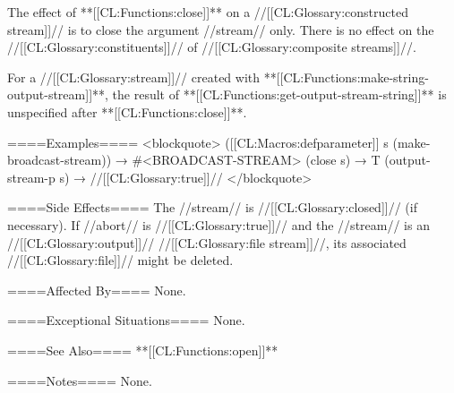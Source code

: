 The effect of **[[CL:Functions:close]]** on a //[[CL:Glossary:constructed stream]]// is to close the argument //stream// only. There is no effect on the //[[CL:Glossary:constituents]]// of //[[CL:Glossary:composite streams]]//.

For a //[[CL:Glossary:stream]]// created with **[[CL:Functions:make-string-output-stream]]**, the result of **[[CL:Functions:get-output-stream-string]]** is unspecified after **[[CL:Functions:close]]**.


====Examples====
<blockquote> ([[CL:Macros:defparameter]] s (make-broadcast-stream)) → #<BROADCAST-STREAM> (close s) → T (output-stream-p s) → //[[CL:Glossary:true]]// </blockquote>

====Side Effects====
The //stream// is //[[CL:Glossary:closed]]// (if necessary). If //abort// is //[[CL:Glossary:true]]// and the //stream// is an //[[CL:Glossary:output]]// //[[CL:Glossary:file stream]]//, its associated //[[CL:Glossary:file]]// might be deleted.

====Affected By====
None.

====Exceptional Situations====
None.

====See Also====
**[[CL:Functions:open]]**

====Notes====
None.

   
